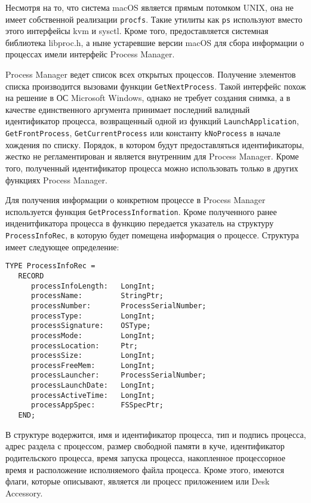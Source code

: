 Несмотря на то, что система macOS является прямым потомком UNIX, она не имеет
собственной реализации \texttt{procfs}. Такие утилиты как \texttt{ps} используют
вместо этого интерфейсы kvm и sysctl\cite{osxproc}. Кроме того, предоставляется
системная библиотека libproc.h, а ныне устаревшие версии macOS для сбора
информации о процессах имели интерфейс Process Manager.

Process Manager ведет список всех открытых процессов\cite{procmanag}. Получение
элементов списка производится вызовами функции \texttt{GetNextProcess}. Такой
интерфейс похож на решение в ОС Microsoft Windows, однако не требует создания
снимка, а в качестве единственного аргумента принимает последний валидный
идентификатор процесса, возвращенный одной из функций %
\texttt{LaunchApplication}, \texttt{GetFrontProcess}, \texttt{GetCurrentProcess}
или константу \texttt{kNoProcess} в начале хождения по списку. Порядок, в
котором будут предоставляться идентификаторы, жестко не регламентирован и
является внутренним для Process Manager. Кроме того, полученный идентификатор
процесса можно использовать только в других функциях Process Manager.

Для получения информации о конкретном процессе в Process Manager используется
функция \texttt{GetProcessInformation}. Кроме полученного ранее инденитфикатора
процесса в функцию передается указатель на структуру \texttt{ProcessInfoRec}, в
которую будет помещена информация о процессе. Структура имеет следующее
определение:

\medskip
\begin{lstlisting}[style=cstyle]
TYPE ProcessInfoRec =
   RECORD
      processInfoLength:   LongInt;
      processName:         StringPtr;
      processNumber:       ProcessSerialNumber;
      processType:         LongInt;
      processSignature:    OSType;
      processMode:         LongInt;
      processLocation:     Ptr;
      processSize:         LongInt;
      processFreeMem:      LongInt;
      processLauncher:     ProcessSerialNumber;
      processLaunchDate:   LongInt;
      processActiveTime:   LongInt;
      processAppSpec:      FSSpecPtr;
   END;
\end{lstlisting}
\medskip

В структуре водержится, имя и идентификатор процесса, тип и подпись процесса,
адрес раздела с процессом, размер свободной памяти в куче, идентификатор
родительского процесса, время запуска процесса, накопленное процессорное время и
расположение исполняемого файла процесса. Кроме этого, имеются флаги, которые
описывают, является ли процесс приложением или Desk Accessory.

